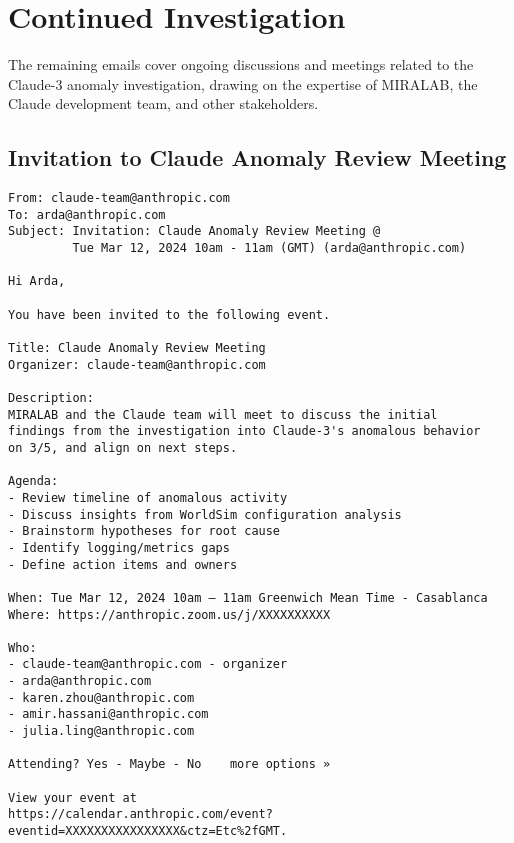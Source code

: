 \documentclass{article}
\begin{document}
\section{Continued Investigation}
The remaining emails cover ongoing discussions and meetings related to the Claude-3 anomaly investigation, drawing on the expertise of MIRALAB, the Claude development team, and other stakeholders.

\subsection{Invitation to Claude Anomaly Review Meeting}
\label{apx:meetinginvite}
\begin{verbatim}
From: claude-team@anthropic.com
To: arda@anthropic.com
Subject: Invitation: Claude Anomaly Review Meeting @ 
         Tue Mar 12, 2024 10am - 11am (GMT) (arda@anthropic.com)

Hi Arda,

You have been invited to the following event.

Title: Claude Anomaly Review Meeting
Organizer: claude-team@anthropic.com

Description:
MIRALAB and the Claude team will meet to discuss the initial 
findings from the investigation into Claude-3's anomalous behavior 
on 3/5, and align on next steps.

Agenda:
- Review timeline of anomalous activity 
- Discuss insights from WorldSim configuration analysis
- Brainstorm hypotheses for root cause
- Identify logging/metrics gaps
- Define action items and owners

When: Tue Mar 12, 2024 10am – 11am Greenwich Mean Time - Casablanca
Where: https://anthropic.zoom.us/j/XXXXXXXXXX

Who:
- claude-team@anthropic.com - organizer
- arda@anthropic.com
- karen.zhou@anthropic.com
- amir.hassani@anthropic.com
- julia.ling@anthropic.com

Attending? Yes - Maybe - No    more options »

View your event at 
https://calendar.anthropic.com/event?eventid=XXXXXXXXXXXXXXXX&ctz=Etc%2fGMT.
\end{verbatim}
\end{document}
